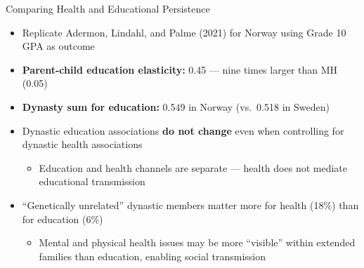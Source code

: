 \documentclass[aspectratio=169]{beamer}
\begin{document}
\begin{frame}{Comparing Health and Educational Persistence}
  \begin{itemize}
    \item Replicate Adermon, Lindahl, and Palme (2021) for Norway using Grade 10 GPA as outcome
    \item \textbf{Parent-child education elasticity:} 0.45 --- nine times larger than MH (0.05)
    \item \textbf{Dynasty sum for education:} 0.549 in Norway (vs.\ 0.518 in Sweden)
    \item Dynastic education associations \textbf{do not change} even when controlling for dynastic health associations
    \begin{itemize}
      \item Education and health channels are separate --- health does not mediate educational transmission
    \end{itemize}
    \item ``Genetically unrelated'' dynastic members matter more for health (18\%) than for education (6\%)
    \begin{itemize}
      \item Mental and physical health issues may be more ``visible'' within extended families than education, enabling social transmission
    \end{itemize}
  \end{itemize}
\end{frame}
\end{document}
